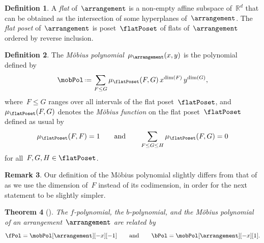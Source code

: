\documentclass{amsart}
\newcommand{\darkblue}{\color{darkblue}} %
\newtheorem{theorem}{Theorem}[section]
\theoremstyle{definition}
\newtheorem{definition}[theorem]{Definition}
\newtheorem{remark}[theorem]{Remark}
\newcommand{\R}{\mathbb{R}} %
\newcommand{\eqdef}{\mbox{\,\raisebox{0.2ex}{\scriptsize\ensuremath{\mathrm:}}\ensuremath{=}\,}} %
\newcommand{\defn}[1]{\textsl{\darkblue #1}} %
\begin{document}
\begin{definition}
A \defn{flat} of~$\arrangement$ is a non-empty affine subspace of~$\R^d$ that can be obtained as the intersection of some hyperplanes of~$\arrangement$.
The \defn{flat poset} of~$\arrangement$ is poset~$\flatPoset$ of flats of~$\arrangement$ ordered by reverse inclusion.
\end{definition}

\begin{definition}
\label{def:MobiusPolynomial}
The \defn{M\"obius polynomial}~$\mu_{\arrangement}(x,y)$ is the polynomial defined by
\[
\mobPol \eqdef \sum_{F \le G} \mu_{\flatPoset}(F,G) \, x^{\dim(F)} \, y^{\dim(G)},
\]
where~$F \le G$ ranges over all intervals of the flat poset~$\flatPoset$, and~$\mu_{\flatPoset}(F,G)$ denotes the \defn{M\"obius function} on the flat poset~$\flatPoset$ defined as usual by
\[
\mu_{\flatPoset}(F, F) = 1
\qquad\text{and}\qquad
\sum_{F \le G \le H} \mu_{\flatPoset}(F,G) = 0
\]
for all~$F, G, H \in \flatPoset$.
\end{definition}

\begin{remark}
Our definition of the M\"obius polynomial slightly differs from that of \cite{Zaslavsky} as we use the dimension of~$F$ instead of its codimension, in order for the next statement to be slightly simpler.
\end{remark}

\begin{theorem}[{\cite[Thm.~A]{Zaslavsky}}]
\label{thm:Zaslavsky}
The $f$-polynomial, the $b$-polynomial, and the M\"obius polynomial of an arrangement~$\arrangement$ are related by
\[
\fPol = \mobPol[\arrangement][-x][-1]
\qquad\text{and}\qquad
\bPol = \mobPol[\arrangement][-x][1].
\]
\end{theorem}
\end{document}
